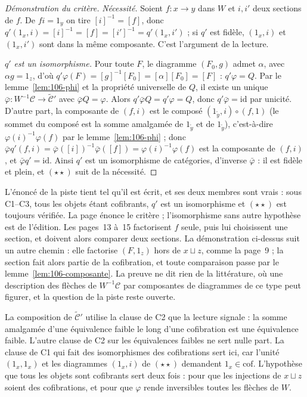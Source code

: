 \begin{proof}[Démonstration du critère]
\emph{Nécessité.} Soient $f : x \to y$ dans $W$ et $i, i'$ deux sections de $f$. De $f i = 1_y$ on tire $[i]^{-1} = [f]$, donc $q'(1_x, i) = [i]^{-1} = [f] = [i']^{-1} = q'(1_x, i')$ ; si $q'$ est fidèle, $(1_x, i)$ et $(1_x, i')$ sont dans la même composante. C'est l'argument de la lecture.

\emph{$q'$ est un isomorphisme.} Pour toute $F$, le diagramme $(F_0, g)$ admet $\alpha$, avec $\alpha g = 1_z$, d'où $q'\varphi(F) = [g]^{-1}[F_0] = [\alpha][F_0] = [F]$ : $q' \varphi = Q$. Par le lemme~\ref{lem:106-phi} et la propriété universelle de $Q$, il existe un unique $\bar\varphi : W^{-1}\mathcal C \to \widetilde{\mathcal C}'$ avec $\bar\varphi Q = \varphi$. Alors $q' \bar\varphi Q = q'\varphi = Q$, donc $q' \bar\varphi = \mathrm{id}$ par unicité. D'autre part, la composante de $(f, i)$ est le composé $(1_{\widetilde y}, i) \circ (f, 1)$ (le sommet du composé est la somme amalgamée de $1_{\widetilde y}$ et de $1_{\widetilde y}$), c'est-à-dire $\varphi(i)^{-1}\varphi(f)$ par le lemme~\ref{lem:106-phi} ; donc $\bar\varphi q'(f, i) = \bar\varphi([i])^{-1}\bar\varphi([f]) = \varphi(i)^{-1}\varphi(f)$ est la composante de $(f, i)$, et $\bar\varphi q' = \mathrm{id}$. Ainsi $q'$ est un isomorphisme de catégories, d'inverse $\bar\varphi$ : il est fidèle et plein, et $(\star\star)$ suit de la nécessité.
\end{proof}

\begin{remarque}
L'énoncé de la piste tient tel qu'il est écrit, et ses deux membres sont vrais : sous C1--C3, tous les objets étant cofibrants, $q'$ est un isomorphisme et $(\star\star)$ est toujours vérifiée. La page énonce le critère ; l'isomorphisme sans autre hypothèse est de l'édition. Les pages~13 à~15 factorisent $f$ seule, puis lui choisissent une section, et doivent alors comparer deux sections. La démonstration ci-dessus suit un autre chemin : elle factorise $(F, 1_z)$ hors de $x \sqcup z$, comme la page~9 ; la section fait alors partie de la cofibration, et toute comparaison passe par le lemme~\ref{lem:106-composante}. La preuve ne dit rien de la littérature, où une description des flèches de $W^{-1}\mathcal C$ par composantes de diagrammes de ce type peut figurer, et la question de la piste reste ouverte.
\end{remarque}

\begin{remarque}
La composition de $\widetilde{\mathcal C}'$ utilise la clause de C2 que la lecture signale : la somme amalgamée d'une équivalence faible le long d'une cofibration est une équivalence faible. L'autre clause de C2 sur les équivalences faibles ne sert nulle part. La clause de C1 qui fait des isomorphismes des cofibrations sert ici, car l'unité $(1_x, 1_x)$ et les diagrammes $(1_x, i)$ de $(\star\star)$ demandent $1_x \in \mathrm{cof}$. L'hypothèse que tous les objets sont cofibrants sert deux fois : pour que les injections de $x \sqcup z$ soient des cofibrations, et pour que $\varphi$ rende inversibles toutes les flèches de $W$.
\end{remarque}

